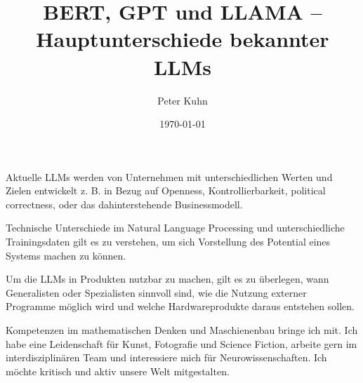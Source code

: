 \documentclass[a4paper,12pt]{article}
\begin{document}
\title{BERT, GPT und LLAMA – Hauptunterschiede bekannter LLMs}
\author{Peter Kuhn}
\date{\today}

\maketitle
Aktuelle LLMs werden von  Unternehmen mit unterschiedlichen Werten und Zielen entwickelt z. B.  in Bezug auf Openness, Kontrollierbarkeit, political correctness,  oder das dahinterstehende Businessmodell.​

 Technische Unterschiede im Natural Language Processing und unterschiedliche Trainingsdaten gilt es zu verstehen, um sich Vorstellung des Potential eines Systems machen zu können. ​

Um die LLMs in Produkten nutzbar zu machen, gilt es zu überlegen, wann Generalisten oder Spezialisten sinnvoll sind, wie die Nutzung externer Programme möglich wird und welche Hardwareprodukte daraus entstehen sollen. ​

Kompetenzen im mathematischen Denken und Maschienenbau bringe ich mit. Ich habe eine Leidenschaft  für Kunst, Fotografie und Science Fiction, arbeite gern im interdisziplinären Team und interessiere mich für Neurowissenschaften. Ich möchte kritisch und aktiv unsere Welt mitgestalten. 
\end{document}

